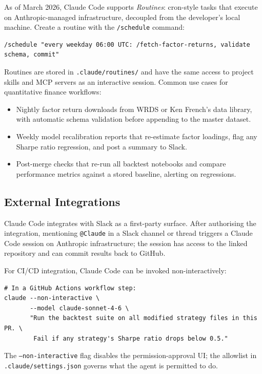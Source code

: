 As of March 2026, Claude Code supports \emph{Routines}: cron-style tasks that
execute on Anthropic-managed infrastructure, decoupled from the developer's
local machine.  Create a routine with the \texttt{/schedule} command:

\begin{verbatim}
/schedule "every weekday 06:00 UTC: /fetch-factor-returns, validate schema, commit"
\end{verbatim}

Routines are stored in \texttt{.claude/routines/} and have the same access to
project skills and MCP servers as an interactive session.  Common use cases for
quantitative finance workflows:

\begin{itemize}
  \item Nightly factor return downloads from WRDS or Ken French's data library,
        with automatic schema validation before appending to the master dataset.
  \item Weekly model recalibration reports that re-estimate factor loadings,
        flag any Sharpe ratio regression, and post a summary to Slack.
  \item Post-merge checks that re-run all backtest notebooks and compare
        performance metrics against a stored baseline, alerting on regressions.
\end{itemize}

\subsection{External Integrations}
\label{app:claude-code:integrations}

Claude Code integrates with Slack as a first-party surface.  After authorising
the integration, mentioning \texttt{@Claude} in a Slack channel or thread
triggers a Claude Code session on Anthropic infrastructure; the session has
access to the linked repository and can commit results back to GitHub.

For CI/CD integration, Claude Code can be invoked non-interactively:

\begin{verbatim}
# In a GitHub Actions workflow step:
claude --non-interactive \
       --model claude-sonnet-4-6 \
       "Run the backtest suite on all modified strategy files in this PR. \
        Fail if any strategy's Sharpe ratio drops below 0.5."
\end{verbatim}

The \texttt{--non-interactive} flag disables the permission-approval UI; the
allowlist in \texttt{.claude/settings.json} governs what the agent is permitted
to do.

